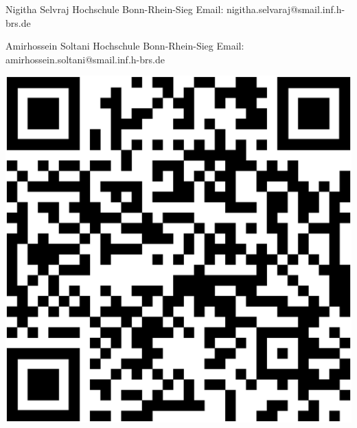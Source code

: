 \documentclass[hbrs-poster.tex]{subfiles}
\begin{document}
    {
        \begin{minipage}{0.75\linewidth}
            Nigitha Selvraj\newline
            Hochschule Bonn-Rhein-Sieg\newline
            Email: nigitha.selvaraj@smail.inf.h-brs.de\newline
        \end{minipage}
        \begin{minipage}{0.75\linewidth}
            Amirhossein Soltani\newline
            Hochschule Bonn-Rhein-Sieg\newline
            Email: amirhossein.soltani@smail.inf.h-brs.de\newline
        \end{minipage}
        \begin{minipage}{0.24\linewidth}
            \vspace{-1.7cm}
            \begin{tikzfigure}
                \includegraphics[scale=0.2]{figures/qrcode.eps}
            \end{tikzfigure}
        \end{minipage}
    }
\end{document}
